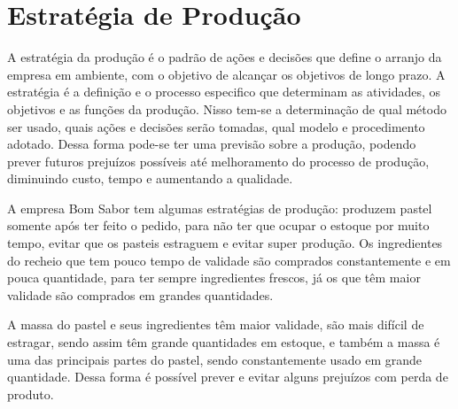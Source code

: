 \section[Estratégia de Produção]{Estratégia de Produção}

A estratégia da produção é o padrão de ações e decisões que  define o arranjo da empresa em ambiente, com o objetivo de alcançar os objetivos de longo prazo. A estratégia é a definição e o processo especifico que determinam as atividades, os objetivos e as funções da produção. Nisso tem-se a determinação de qual método ser usado, quais ações e decisões serão tomadas, qual modelo e procedimento adotado. Dessa forma pode-se  ter uma previsão sobre a produção, podendo prever futuros prejuízos possíveis até melhoramento do processo de produção, diminuindo custo, tempo e aumentando a qualidade.

A empresa Bom Sabor tem algumas estratégias de produção: produzem pastel somente após ter feito o pedido, para não ter que ocupar o estoque por muito tempo, evitar que os pasteis estraguem e evitar super produção. Os ingredientes do recheio que tem pouco tempo de validade são comprados constantemente e em pouca quantidade, para ter sempre ingredientes frescos, já os que têm maior validade são comprados em grandes quantidades.

A massa do pastel e seus ingredientes têm maior validade, são mais difícil  de estragar, sendo assim têm grande quantidades em estoque, e também a massa é uma das principais partes do pastel, sendo  constantemente  usado em grande quantidade.
Dessa forma é possível prever e evitar alguns prejuízos com perda de produto. 

